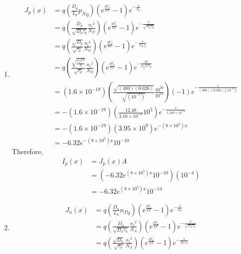 \documentclass[fleqn, a4paper, 10pt, oneside]{amsart}
\theoremstyle{definition}
\theoremstyle{theorem}
\begin{document}
\begin{solution}
	\begin{enumerate}[leftmargin=*]
		\item
			\begin{align*}
				J_p(x) &= q \left( \frac{D_p}{L_p} {p_N}_0 \right) \left( e^{\frac{q V_a}{k T}} - 1 \right) e^{-\frac{x}{L_p}}\\
				&= q \left( \frac{D_p}{\sqrt{D_p \tau_p}} \frac{{n_i}^2}{N_D} \right) \left( e^{\frac{q V_a}{k T}} - 1 \right) e^{-\frac{x}{\sqrt{D_p \tau_p}}}\\
				&= q \left( \frac{\sqrt{D_p}}{\sqrt{\tau_p}} \frac{{n_i}^2}{N_D} \right) \left( e^{\frac{q V_a}{k T}} - 1 \right) e^{-\frac{x}{D_p \tau_p}}\\
				&= q \left( \frac{\sqrt{\frac{\mu_p k T}{q}}}{\sqrt{\tau_p}} \frac{{n_i}^2}{N_D} \right) \left( e^{\frac{q V_a}{k T}} - 1 \right) e^{-\frac{q x}{\mu_p k T \tau_p}}\\
				&= \left( 1.6 \times 10^{-19} \right) \left( \frac{\sqrt{(480) (0.026)}}{\sqrt{\left( 10^{-7} \right)}} \frac{10^{20}}{10^{15}} \right) (-1) e^{-\frac{x}{(480) (0.026) \left( 10^{-7} \right)}}\\
				&= -\left( 1.6 \times 10^{-19} \right) \left( \frac{12.48}{3.16 \times 10^{-4}} 10^5 \right) e^{-\frac{x}{1.248 \times 10^{-6}}}\\
				&= -\left( 1.6 \times 10^{-19} \right) \left( 3.95 \times 10^9 \right) e^{-\left( 8 \times 10^5 \right) x}\\
				&= -6.32 e^{-\left( 8 \times 10^5 \right) x} 10^{-10}
			\end{align*}
			Therefore,
			\begin{align*}
				I_p(x) &= J_p(x) A\\
				&= \left( -6.32 e^{\left( 8 \times 10^5 \right) x} 10^{-10} \right) \left( 10^{-4} \right)\\
				&= -6.32 e^{\left( 8 \times 10^5 \right) x} 10^{-14}
			\end{align*}
		\item
			\begin{align*}
				J_n(x) &= q \left( \frac{D_n}{L_n} {n_P}_0 \right) \left( e^{\frac{q V_a}{k T}} - 1 \right) e^{-\frac{x}{L_n}}\\
				&= q \left( \frac{D_n}{\sqrt{D_n \tau_n}} \frac{{n_i}^2}{N_A} \right) \left( e^{\frac{q V_a}{k T}} - 1 \right) e^{-\frac{x}{\sqrt{D_n \tau_n}}}\\
				&= q \left( \frac{\sqrt{D_n}}{\sqrt{\tau_n}} \frac{{n_i}^2}{N_A} \right) \left( e^{\frac{q V_a}{k T}} - 1 \right) e^{-\frac{x}{D_n \tau_n}}\\

\end{align*}
\end{enumerate}
\end{solution}
\end{document}

